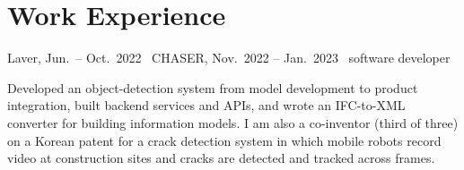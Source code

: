 \documentclass[10.5pt,a4paper]{article}
\newcommand{\facts}[1]{{\small\color{mute}#1}\par\vspace{2pt}}
\begin{document}
\section{Work Experience}
\facts{Laver, Jun.\ -- Oct.\ 2022 \textbullet\ CHASER, Nov.\ 2022 -- Jan.\ 2023 \textbullet\ software developer}
Developed an object-detection system from model development to product integration, built backend services and APIs, and wrote an IFC-to-XML converter for building information models. I am also a co-inventor (third of three) on a Korean patent for a crack detection system in which mobile robots record video at construction sites and cracks are detected and tracked across frames.
\end{document}
